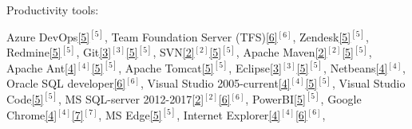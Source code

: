\begin{cventries}
  \cventry
    {Productivity tools:} %
    {} %
    {} %
    {} %
    {
      \vspace{0.1cm}
      \begin{cvitems} %
        \item[] {        
        \textcolor{rainbowcolor-olive}{Azure DevOps\ref{5}{$^{[5]}$}},         
        \textcolor{rainbowcolor-olive}{Team Foundation Server (TFS)\ref{6}{$^{[6]}$}},
        \textcolor{rainbowcolor-olive}{Zendesk\ref{5}{$^{[5]}$}},
        \textcolor{rainbowcolor-olive}{Redmine\ref{5}{$^{[5]}$}},
        \textcolor{rainbowcolor-olive}{Git\ref{3}{$^{[3]}$}\ref{5}{$^{[5]}$}}, 
        \textcolor{rainbowcolor-olive}{SVN\ref{2}{$^{[2]}$}\ref{5}{$^{[5]}$}},
        \textcolor{rainbowcolor-olive}{Apache Maven\ref{2}{$^{[2]}$}\ref{5}{$^{[5]}$}},
        \textcolor{rainbowcolor-olive}{Apache Ant\ref{4}{$^{[4]}$}\ref{5}{$^{[5]}$}},  
        \textcolor{rainbowcolor-olive}{Apache Tomcat\ref{5}{$^{[5]}$}}, 
        \textcolor{rainbowcolor-olive}{Eclipse\ref{3}{$^{[3]}$}\ref{5}{$^{[5]}$}},  
        \textcolor{rainbowcolor-olive}{Netbeans\ref{4}{$^{[4]}$}}, 
        \textcolor{rainbowcolor-olive}{Oracle SQL developer\ref{6}{$^{[6]}$}},
        \textcolor{rainbowcolor-olive}{Visual Studio 2005-current\ref{4}{$^{[4]}$}\ref{5}{$^{[5]}$}},
        \textcolor{rainbowcolor-olive}{Visual Studio Code\ref{5}{$^{[5]}$}},
        \textcolor{rainbowcolor-olive}{MS SQL-server 2012-2017\ref{2}{$^{[2]}$}\ref{6}{$^{[6]}$}},
		\textcolor{rainbowcolor-olive}{PowerBI\ref{5}{$^{[5]}$}}, 
        \textcolor{rainbowcolor-olive}{Google Chrome\ref{4}{$^{[4]}$}\ref{7}{$^{[7]}$}},
        \textcolor{rainbowcolor-olive}{MS Edge\ref{5}{$^{[5]}$}},
        \textcolor{rainbowcolor-olive}{Internet Explorer\ref{4}{$^{[4]}$}\ref{6}{$^{[6]}$}},
}
\end{cvitems}}
\end{cventries}
